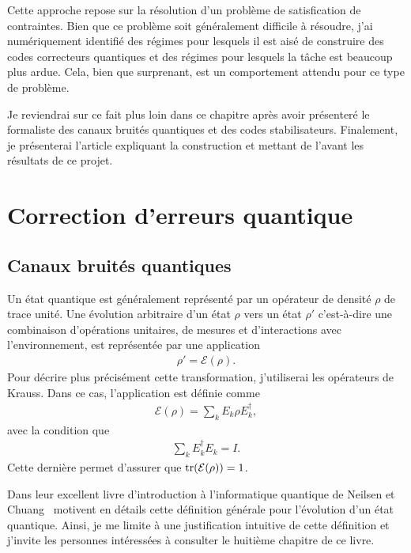 Cette approche repose sur la résolution d'un problème de satisfication de contraintes.
Bien que ce problème soit généralement difficile à résoudre,
j'ai numériquement identifié des régimes pour lesquels il est aisé de
construire des codes correcteurs quantiques
et des régimes pour lesquels la tâche est beaucoup plus ardue.
Cela, bien que surprenant, est un comportement attendu pour ce type de problème.

Je reviendrai sur ce fait plus loin dans ce chapitre
après avoir présenteré le formaliste des canaux bruités quantiques 
et des codes stabilisateurs.
Finalement,
je présenterai l'article expliquant la construction et 
mettant de l'avant les résultats de ce projet.

\section{Correction d'erreurs quantique}

\subsection{Canaux bruités quantiques}

Un état quantique est généralement représenté par un opérateur de densité $\rho$
de trace unité.
Une évolution arbitraire d'un état $\rho$ vers un état $\rho'$
c'est-à-dire une combinaison d'opérations unitaires,
de mesures et d'interactions avec l'environnement, 
est représentée par une application
\begin{align}
  \rho' = \mathcal{E}(\rho).
\end{align}
Pour décrire plus précisément cette transformation,
j'utiliserai les opérateurs de Krauss.
Dans ce cas,
l'application est définie comme
\begin{align}
  \mathcal{E}(\rho) = \sum_{k} E_k \rho E_k^\dag,
\end{align}
avec la condition que 
\begin{align}
  \sum_k E_k^\dag E_k = I.
\end{align}
Cette dernière permet d'assurer que $\tr(\mathcal{E}(\rho)) = 1$.

Dans leur excellent livre d'introduction à l'informatique quantique de 
Neilsen et Chuang~\cite{nielsen_quantum_2010} motivent en détails 
cette définition générale pour l'évolution d'un état quantique.
Ainsi, je me limite à une justification intuitive de cette définition
et j'invite les personnes intéressées à consulter le huitième chapitre de ce livre.


